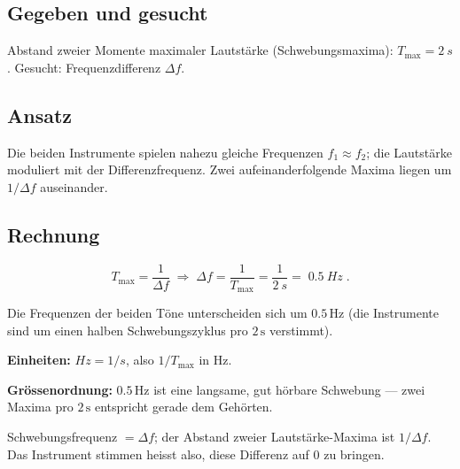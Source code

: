 
\subsection*{Gegeben und gesucht}
Abstand zweier Momente maximaler Lautstärke (Schwebungsmaxima):
$T_{\max}=\qty{2}{s}$. Gesucht: Frequenzdifferenz $\Delta f$.

\subsection*{Ansatz}
Die beiden Instrumente spielen nahezu gleiche Frequenzen $f_1\approx f_2$; die
Lautstärke moduliert mit der Differenzfrequenz. Zwei aufeinanderfolgende Maxima
liegen um $1/\Delta f$ auseinander.

\subsection*{Rechnung}
\begin{equation}
  T_{\max}=\frac{1}{\Delta f}
  \;\Rightarrow\;
  \Delta f=\frac{1}{T_{\max}}=\frac{1}{\qty{2}{s}}
  =\boxed{\;\qty{0.5}{Hz}\;}.
\end{equation}

\begin{ergebnis}
Die Frequenzen der beiden Töne unterscheiden sich um $0.5\,\mathrm{Hz}$
(die Instrumente sind um einen halben Schwebungszyklus pro $2\,\mathrm s$
verstimmt).
\end{ergebnis}

\begin{kontrolle}
\textbf{Einheiten:} $Hz=1/s$, also $1/T_{\max}$ in \unit{\hertz}. \checkmark

\textbf{Grössenordnung:} $0.5\,\mathrm{Hz}$ ist eine langsame, gut hörbare
Schwebung --- zwei Maxima pro $2\,\mathrm s$ entspricht gerade dem Gehörten.
\end{kontrolle}

\begin{merksatz}
Schwebungsfrequenz $=\Delta f$; der Abstand zweier Lautstärke-Maxima ist
$1/\Delta f$. Das Instrument stimmen heisst also, diese Differenz auf $0$
zu bringen.
\end{merksatz}
